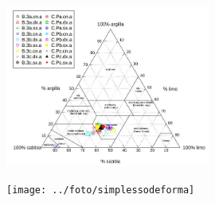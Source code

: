 \documentclass[xcolor={usenames, table, x11names}, final, 10pt]{beamer}
\begin{document}
\begin{frame}
  \vskip 1.5cm
  \begin{figure}
    \centering
    \includegraphics[width=0.6\textwidth]{../foto/USDA_triangolo} 
  \end{figure}
\end{frame}

\begin{frame}
  \vskip 1.5cm
  \begin{figure}
    \centering
    \texttt{[image: ../foto/simplessodeforma]} 
  \end{figure}
\end{frame}
\end{document}
